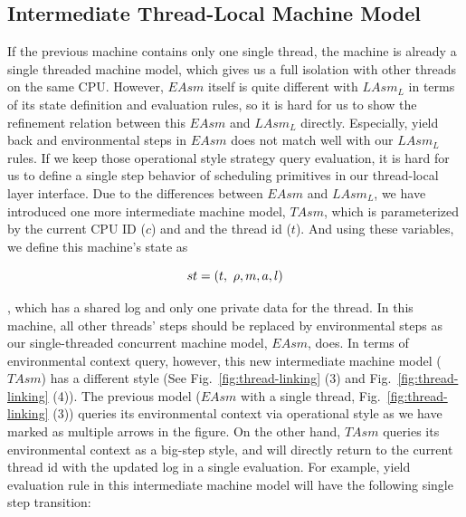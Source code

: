 \subsection{Intermediate Thread-Local Machine Model}\label{subsec:tasm}
If the previous machine contains only one single thread,
the machine is already a single threaded machine model, which gives us a full isolation with other threads on the same CPU.
However, $EAsm$ itself is quite different with $LAsm_L$ in terms of its state definition and evaluation rules,
so it is hard for us to show the refinement relation between this $EAsm$ and $LAsm_L$ directly. 
Especially, yield back and environmental steps in $EAsm$ does not match well with our $LAsm_L$ rules. 
If we keep those operational style strategy query evaluation, it is hard for us to define a single step behavior of 
scheduling primitives in our thread-local layer interface.
Due to the differences between $EAsm$ and $LAsm_L$, 
we have introduced one more intermediate machine model, $TAsm$,
which is parameterized by the current CPU ID ($c$) and and the thread id ($t$). 
And using these variables, we define this machine's state as
\begin{small}
\[
st = (t, \ \rho, m, a, l) 
\]
\end{small}
, which has a shared log and only one private data for the thread.
In this machine, all other threads' steps should be replaced by environmental steps
as our single-threaded concurrent machine model, $EAsm$, does.
In terms of environmental context query, however, 
this new intermediate machine model ($TAsm$) has a different style (See Fig.~\ref{fig:thread-linking} (3) and Fig.~\ref{fig:thread-linking} (4)).
The previous model ($EAsm$ with a single thread, Fig.~\ref{fig:thread-linking} (3)) 
queries its environmental context via operational style as we have marked as multiple arrows in the figure. 
On the other hand, $TAsm$ queries its environmental context as a big-step style, and 
will directly return to the current thread id with the updated log in a single evaluation. 
For example, yield evaluation rule in this intermediate machine model will have the following single step transition:
\begin{center}
\end{center}
